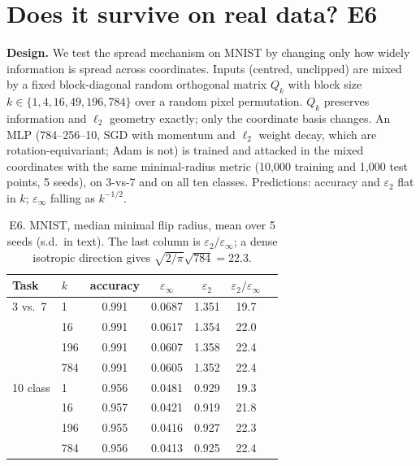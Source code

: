 \documentclass[11pt]{article}
\newcommand{\ltwo}{\ell_2}
\newcommand{\epsinf}{\varepsilon_\infty}
\newcommand{\epstwo}{\varepsilon_2}
\begin{document}
\section{Does it survive on real data? E6}

\textbf{Design.} We test the spread mechanism on MNIST by changing only how widely
information is spread across coordinates. Inputs (centred, unclipped) are mixed
by a fixed block-diagonal random orthogonal matrix $Q_k$ with block size
$k\in\{1,4,16,49,196,784\}$ over a random pixel permutation. $Q_k$ preserves
information and $\ltwo$ geometry exactly; only the coordinate basis changes. An MLP
(784--256--10, SGD with momentum and $\ell_2$ weight decay, which are rotation-equivariant;
Adam is not) is trained and attacked in the mixed coordinates with the same minimal-radius metric
(10{,}000 training and 1{,}000 test points, 5 seeds), on 3-vs-7 and on all ten classes.
Predictions: accuracy and $\epstwo$ flat in $k$; $\epsinf$ falling as $k^{-1/2}$.

\begin{table}[h]
\centering
\caption{E6. MNIST, median minimal flip radius, mean over 5 seeds
(s.d.\ in text). The last column is $\epstwo/\epsinf$; a dense isotropic direction
gives $\sqrt{2/\pi}\sqrt{784}=22.3$.}
\label{tab:real}
\begin{tabular}{llccccc}
\toprule
Task & $k$ & accuracy & $\epsinf$ & $\epstwo$ & $\epstwo/\epsinf$\\
\midrule
3 vs.\ 7 & 1   & 0.991 & 0.0687 & 1.351 & 19.7\\
         & 16  & 0.991 & 0.0617 & 1.354 & 22.0\\
         & 196 & 0.991 & 0.0607 & 1.358 & 22.4\\
         & 784 & 0.991 & 0.0605 & 1.352 & 22.4\\
10 class & 1   & 0.956 & 0.0481 & 0.929 & 19.3\\
         & 16  & 0.957 & 0.0421 & 0.919 & 21.8\\
         & 196 & 0.955 & 0.0416 & 0.927 & 22.3\\
         & 784 & 0.956 & 0.0413 & 0.925 & 22.4\\
\bottomrule
\end{tabular}
\end{table}
\end{document}
